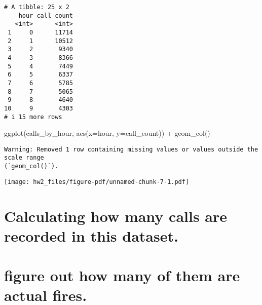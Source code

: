 \documentclass[
  letterpaper,
  DIV=11,
  numbers=noendperiod]{scrartcl}
\newenvironment{Shaded}{\begin{snugshade}}{\end{snugshade}}
\newcommand{\AttributeTok}[1]{\textcolor[rgb]{0.40,0.45,0.13}{#1}}
\newcommand{\DecValTok}[1]{\textcolor[rgb]{0.68,0.00,0.00}{#1}}
\newcommand{\FunctionTok}[1]{\textcolor[rgb]{0.28,0.35,0.67}{#1}}
\newcommand{\NormalTok}[1]{\textcolor[rgb]{0.00,0.23,0.31}{#1}}
\newcommand{\OtherTok}[1]{\textcolor[rgb]{0.00,0.23,0.31}{#1}}
\newcommand{\SpecialCharTok}[1]{\textcolor[rgb]{0.37,0.37,0.37}{#1}}
\begin{document}
\begin{verbatim}
# A tibble: 25 x 2
    hour call_count
   <int>      <int>
 1     0      11714
 2     1      10512
 3     2       9340
 4     3       8366
 5     4       7449
 6     5       6337
 7     6       5785
 8     7       5065
 9     8       4640
10     9       4303
# i 15 more rows
\end{verbatim}

\begin{Shaded}
\begin{Highlighting}[]
\FunctionTok{ggplot}\NormalTok{(calls\_by\_hour, }\FunctionTok{aes}\NormalTok{(}\AttributeTok{x=}\NormalTok{hour, }\AttributeTok{y=}\NormalTok{call\_count)) }\SpecialCharTok{+}
  \FunctionTok{geom\_col}\NormalTok{()}
\end{Highlighting}
\end{Shaded}

\begin{verbatim}
Warning: Removed 1 row containing missing values or values outside the scale range
(`geom_col()`).
\end{verbatim}

\texttt{[image: hw2\_files/figure-pdf/unnamed-chunk-7-1.pdf]}

\section{Calculating how many calls are recorded in this
dataset.}\label{calculating-how-many-calls-are-recorded-in-this-dataset.}

\section{figure out how many of them are actual
fires.}\label{figure-out-how-many-of-them-are-actual-fires.}

\begin{Shaded}
\end{Shaded}
\end{document}
